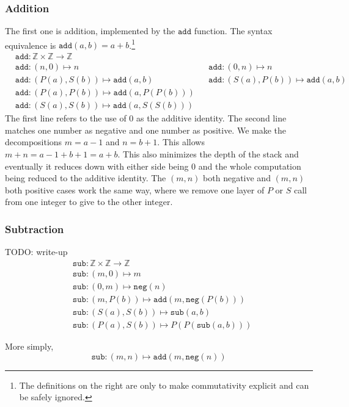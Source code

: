 \documentclass{article}
\newcommand{\Z}{\mathbb{Z}}
\newcommand{\ttneg}{\mathtt{neg}}
\newcommand{\ttadd}{\mathtt{add}}
\newcommand{\ttsub}{\mathtt{sub}}
\begin{document}
\subsubsection*{Addition}
The first one is addition, implemented by the $\ttadd$ function. The syntax equivalence is $\ttadd(a, b) = a + b$.\footnote{The definitions on the right are only to make commutativity explicit and can be safely ignored.}
\begin{align*}
&{} \ttadd : \Z \times \Z \to \Z \\
&{} \ttadd : (n, 0) \mapsto n &
&{} \ttadd : (0, n) \mapsto n \\
&{} \ttadd : (P(a), S(b)) \mapsto \ttadd(a, b) &
&{} \ttadd : (S(a), P(b)) \mapsto \ttadd(a, b) \\
&{} \ttadd : (P(a), P(b)) \mapsto \ttadd(a, P(P(b))) \\
&{} \ttadd : (S(a), S(b)) \mapsto \ttadd(a, S(S(b)))
\end{align*}
The first line refers to the use of 0 as the additive identity. The second line matches one number as negative and one number as positive.   We make the decompositions $m = a - 1$ and $n = b + 1$. This allows $m + n = a - 1 + b + 1 = a + b$. This also minimizes the depth of the stack and eventually it reduces down with either side being 0 and the whole computation being reduced to the additive identity. The $(m, n)$ both negative and $(m, n)$ both positive cases work the same way, where we remove one layer of $P$ or $S$ call from one integer to give to the other integer.

\subsubsection*{Subtraction}
TODO: write-up
\begin{align*}
&{} \ttsub : \Z \times \Z \to \Z \\
&{} \ttsub : (m, 0) \mapsto m \\
&{} \ttsub : (0, m) \mapsto \ttneg(n) \\
&{} \ttsub : (m, P(b)) \mapsto \ttadd(m, \ttneg(P(b))) \\
&{} \ttsub : (S(a), S(b)) \mapsto \ttsub(a, b) \\
&{} \ttsub : (P(a), S(b)) \mapsto P(P(\ttsub(a, b)))
\end{align*}

More simply,
\[ \ttsub : (m, n) \mapsto \ttadd(m, \ttneg(n)) \]
\end{document}
